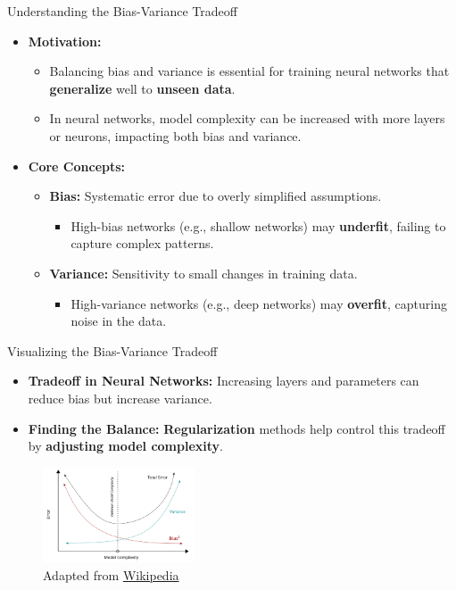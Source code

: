 \documentclass[serif, aspectratio=169]{beamer}
\begin{document}
\begin{frame}{Understanding the Bias-Variance Tradeoff}
    \begin{itemize}
        \item \textbf{Motivation:} 
            \begin{itemize}
                \item Balancing bias and variance is essential for training neural networks that \textbf{generalize} well to \textbf{unseen data}.
                \item In neural networks, model complexity can be increased with more layers or neurons, impacting both bias and variance.
            \end{itemize}
        \item \textbf{Core Concepts:} 
            \begin{itemize}
                \item \textbf{Bias:} Systematic error due to overly simplified assumptions.
                    \begin{itemize}
                        \item High-bias networks (e.g., shallow networks) may \textbf{underfit}, failing to capture complex patterns.
                    \end{itemize}
                \item \textbf{Variance:} Sensitivity to small changes in training data.
                    \begin{itemize}
                        \item High-variance networks (e.g., deep networks) may \textbf{overfit}, capturing noise in the data.
                    \end{itemize}
            \end{itemize}
    \end{itemize}
\end{frame}

\begin{frame}{Visualizing the Bias-Variance Tradeoff}
    \begin{itemize}
        \item \textbf{Tradeoff in Neural Networks:} Increasing layers and parameters can reduce bias but increase variance.
        \item \textbf{Finding the Balance:} \textbf{Regularization} methods help control this tradeoff by \textbf{adjusting model complexity}.
    \end{itemize}
\begin{figure}
        \centering
        \includegraphics[width=0.4\textwidth]{pic/bv.png}
        \caption{Adapted from \href{en.wikipedia.org/wiki/Bias–variance_tradeoff}{Wikipedia}}
    \end{figure}
\end{frame}
\end{document}
